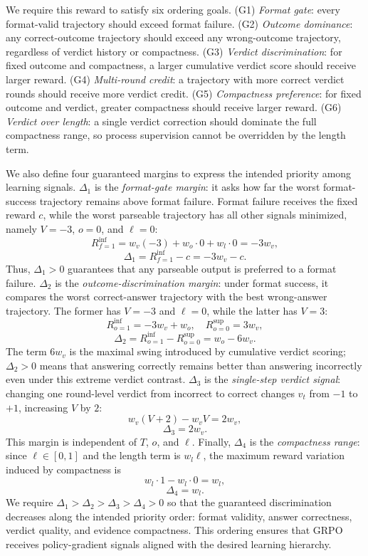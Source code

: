 We require this reward to satisfy six ordering goals. (G1) \textit{Format
gate}: every format-valid trajectory should exceed format failure. (G2)
\textit{Outcome dominance}: any correct-outcome trajectory should exceed any
wrong-outcome trajectory, regardless of verdict history or compactness. (G3)
\textit{Verdict discrimination}: for fixed outcome and compactness, a larger
cumulative verdict score should receive larger reward. (G4) \textit{Multi-round
credit}: a trajectory with more correct verdict rounds should receive more
verdict credit. (G5) \textit{Compactness preference}: for fixed outcome and
verdict, greater compactness should receive larger reward. (G6)
\textit{Verdict over length}: a single verdict correction should dominate the
full compactness range, so process supervision cannot be overridden by the
length term.

We also define four guaranteed margins to express the intended priority among
learning signals. $\Delta_1$ is the \emph{format-gate margin}: it asks how far
the worst format-success trajectory remains above format failure. Format
failure receives the fixed reward $c$, while the worst parseable trajectory has
all other signals minimized, namely $V=-3$, $o=0$, and $\ell=0$:
\[
R^{\inf}_{f=1}=w_v(-3)+w_o\cdot 0+w_l\cdot 0=-3w_v,
\]
\[
\Delta_1=R^{\inf}_{f=1}-c=-3w_v-c.
\]
Thus, $\Delta_1>0$ guarantees that any parseable output is preferred to a
format failure. $\Delta_2$ is the \emph{outcome-discrimination margin}: under
format success, it compares the worst correct-answer trajectory with the best
wrong-answer trajectory. The former has $V=-3$ and $\ell=0$, while the latter
has $V=3$:
\[
R^{\inf}_{o=1}=-3w_v+w_o,\quad
R^{\sup}_{o=0}=3w_v,
\]
\[
\Delta_2=R^{\inf}_{o=1}-R^{\sup}_{o=0}=w_o-6w_v.
\]
The term $6w_v$ is the maximal swing introduced by cumulative verdict scoring;
$\Delta_2>0$ means that answering correctly remains better than answering
incorrectly even under this extreme verdict contrast. $\Delta_3$ is the
\emph{single-step verdict signal}: changing one round-level verdict from
incorrect to correct changes $v_t$ from $-1$ to $+1$, increasing $V$ by $2$:
\[
w_v(V+2)-w_vV=2w_v,
\]
\[
\Delta_3=2w_v.
\]
This margin is independent of $T$, $o$, and $\ell$. Finally, $\Delta_4$ is the
\emph{compactness range}: since $\ell\in[0,1]$ and the length term is
$w_l\ell$, the maximum reward variation induced by compactness is
\[
w_l\cdot 1-w_l\cdot 0=w_l,
\]
\[
\Delta_4=w_l.
\]
We require $\Delta_1>\Delta_2>\Delta_3>\Delta_4>0$ so that the guaranteed
discrimination decreases along the intended priority order: format validity,
answer correctness, verdict quality, and evidence compactness. This ordering
ensures that GRPO receives policy-gradient signals aligned with the desired
learning hierarchy.

